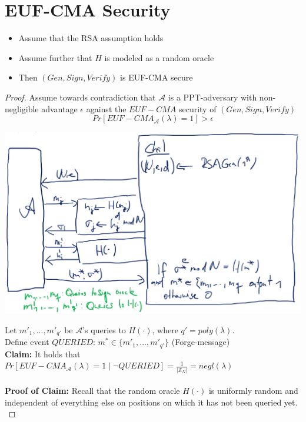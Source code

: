 \section{EUF-CMA Security}
    \begin{theorem}\label{thm9.1}
        \begin{itemize}
            \item Assume that the RSA assumption holds
            \item Assume further that $H$ is modeled as a random oracle
            \item Then $(Gen,Sign,Verify)$ is EUF-CMA secure
        \end{itemize}
    \end{theorem}
    \begin{proof}
        Assume towards contradiction that $\mathcal{A}$ is a PPT-adversary with non-negligible advantage $\epsilon$ against the $EUF-CMA$ security of $(Gen,Sign,Verify)$
        $$Pr[EUF-CMA_{\mathcal{A}}(\lambda)=1] > \epsilon$$
        \begin{center}
	        \includegraphics[width=160mm]{Graphics/Digital Signatures/ds5.png}
        \end{center}
        Let $m'_1,...,m'_{q'}$ be $\mathcal{A}$'s queries to $H(\cdot)$, where $q'=poly(\lambda)$.\\
        Define event $QUERIED$: $m^* \in \{m'_1,...,m'_{q'}\}$ (Forge-message)\\
        \textbf{Claim:} It holds that $Pr[EUF-CMA_{\mathcal{A}}(\lambda)=1 \mid \neg QUERIED] = \frac{1}{|\mathbb{Z}_N|} = negl(\lambda)$\\\\
        \textbf{Proof of Claim:}
            Recall that the random oracle $H(\cdot)$ is uniformly random and independent of everything else on positions on which it has not been queried yet.\\

\end{proof}
